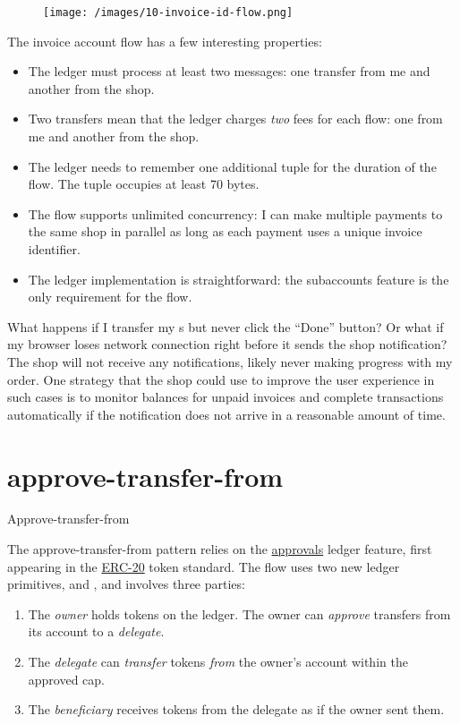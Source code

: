 \documentclass{article}
\begin{document}
\begin{figure}[grayscale-diagram]
\texttt{[image: /images/10-invoice-id-flow.png]}
\end{figure}

The invoice account flow has a few interesting properties:
\begin{itemize}
  \item The ledger must process at least two messages: one transfer from me and another from the shop.
  \item Two transfers mean that the ledger charges \emph{two} fees for each flow: one from me and another from the shop.
  \item 
    The ledger needs to remember one additional  tuple for the duration of the flow.
    The tuple occupies at least 70 bytes.
  \item The flow supports unlimited concurrency: I can make multiple payments to the same shop in parallel as long as each payment uses a unique invoice identifier.
  \item 
    The ledger implementation is straightforward: the subaccounts feature is the only requirement for the flow.
\end{itemize}

What happens if I transfer my s but never click the ``Done'' button?
Or what if my browser loses network connection right before it sends the shop notification?
The shop will not receive any notifications, likely never making progress with my order.
One strategy that the shop could use to improve the user experience in such cases is to monitor balances for unpaid invoices and complete transactions automatically if the notification does not arrive in a reasonable amount of time.

\section{approve-transfer-from}{Approve-transfer-from}

The approve-transfer-from pattern relies on the \href{/posts/09-fungible-tokens-101.html#approvals}{approvals} ledger feature, first appearing in the \href{https://ethereum.org/en/developers/docs/standards/tokens/erc-20/}{ERC-20} token standard.
The flow uses two new ledger primitives,  and , and involves three parties:
\begin{enumerate}
  \item The \emph{owner} holds tokens on the ledger. The owner can \emph{approve} transfers from its account to a \emph{delegate}.
  \item The \emph{delegate} can \emph{transfer} tokens \emph{from} the owner's account within the approved cap.
  \item The \emph{beneficiary} receives tokens from the delegate as if the owner sent them.
\end{enumerate}
\end{document}
